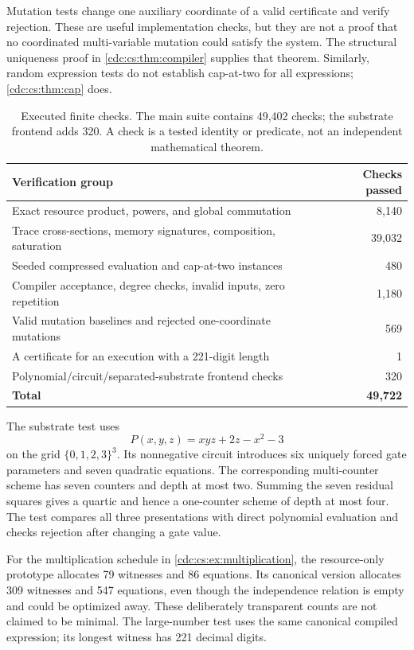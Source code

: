 \documentclass[11pt,a4paper]{article}
\theoremstyle{definition}
\theoremstyle{remark}
\begin{document}
Mutation tests change one auxiliary coordinate of a valid certificate and
verify rejection. These are useful implementation checks, but they are not a
proof that no coordinated multi-variable mutation could satisfy the system.
The structural uniqueness proof in \cref{cdc:cs:thm:compiler} supplies that theorem.
Similarly, random expression tests do not establish cap-at-two for all
expressions; \cref{cdc:cs:thm:cap} does.

\begin{table}[htbp]
\centering
\small
\begin{tabular}{@{}p{}r@{}}
\toprule
Verification group & Checks passed\\
\midrule
Exact resource product, powers, and global commutation & 8,140\\
Trace cross-sections, memory signatures, composition, saturation & 39,032\\
Seeded compressed evaluation and cap-at-two instances & 480\\
Compiler acceptance, degree checks, invalid inputs, zero repetition & 1,180\\
Valid mutation baselines and rejected one-coordinate mutations & 569\\
A certificate for an execution with a 221-digit length & 1\\
Polynomial/circuit/separated-substrate frontend checks & 320\\
\midrule
\textbf{Total} & \textbf{49,722}\\
\bottomrule
\end{tabular}
\caption{Executed finite checks. The main suite contains 49,402 checks; the
substrate frontend adds 320. A check is a tested identity or predicate, not
an independent mathematical theorem.}
\label{cdc:cs:tab:tests}
\end{table}

The substrate test uses
\[
P(x,y,z)=xyz+2z-x^2-3
\]
on the grid $\{0,1,2,3\}^3$. Its nonnegative circuit introduces six uniquely
forced gate parameters and seven quadratic equations. The corresponding
multi-counter scheme has seven counters and depth at most two. Summing the
seven residual squares gives a quartic and hence a one-counter scheme of
depth at most four. The test compares all three presentations with direct
polynomial evaluation and checks rejection after changing a gate value.

For the multiplication schedule in \cref{cdc:cs:ex:multiplication}, the resource-only
prototype allocates 79 witnesses and 86 equations. Its canonical version
allocates 309 witnesses and 547 equations, even though the independence
relation is empty and could be optimized away. These deliberately transparent
counts are not claimed to be minimal. The large-number test uses the same
canonical compiled expression; its longest witness has 221 decimal digits.
\end{document}
